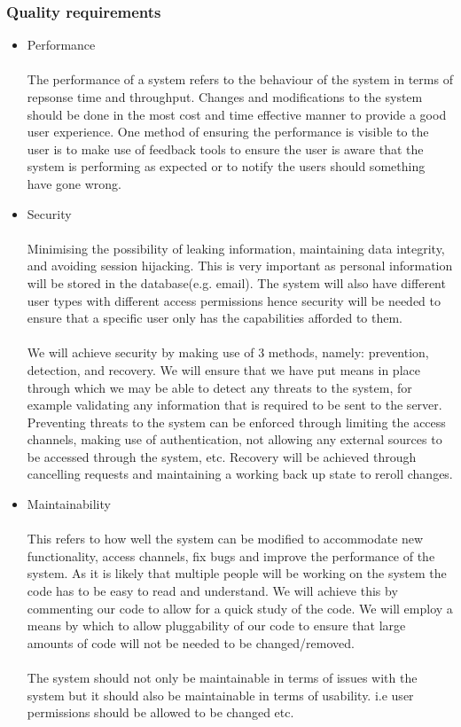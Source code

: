 \documentclass[a4paper]{article}
\begin{document}
    \subsubsection{Quality requirements}
    \begin{itemize}
     \begin{itemize}
    \item Performance \\\\
        The performance of a system refers to the behaviour of the system in terms of repsonse time and throughput. Changes and modifications to the system should be done in the most cost and time effective manner to provide a good user experience.
        One method of ensuring the performance is visible to the user is to make use of feedback tools to ensure the user is aware that the system is performing as expected or to notify the users should something have gone wrong.  
    \item Security \\\\
        Minimising the possibility of leaking information, maintaining data integrity, and avoiding session hijacking. This is very important as personal information will be stored in the database(e.g. email). The system will also have different user types with different access permissions hence security will be needed to ensure that a specific user only has the capabilities afforded to them. 
        \\\\
        We will achieve security by making use of 3 methods, namely: prevention, detection, and recovery.
        We will ensure that we have put means in place through which we may be able to detect any threats to the system, for example validating any information that is required to be sent to the server. Preventing threats to the system can be enforced through limiting the access channels, making use of authentication, not allowing any external sources to be accessed through the system, etc. Recovery will be achieved through cancelling requests and maintaining a working back up state to reroll changes.
    \item Maintainability \\\\
        This refers to how well the system can be modified to accommodate new functionality, access channels, fix bugs and improve the performance of the system. As it is likely that multiple people will be working on the system the code has to be easy to read and understand. We will achieve this by commenting our code to allow for a quick study of the code. We will employ a means by which to allow pluggability of our code to ensure that large amounts of code will not be needed to be changed/removed.
        \\\\
        The system should not only be maintainable in terms of issues with the system but it should also be maintainable in terms of usability. i.e user permissions should be allowed to be changed etc.
        

\end{itemize}
\end{itemize}
\end{document}
